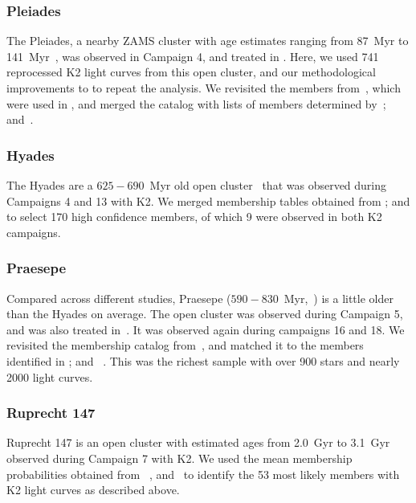 \documentclass{aa}
\begin{document}
\subsubsection{Pleiades}
The Pleiades, a nearby ZAMS cluster with age estimates ranging from 87~Myr to 141~Myr~\citep{bell_pre-main-sequence_2012, scholz2015, dahm_reexamining_2015, yen2018, gossage2018, bossini2019}, was observed in Campaign 4, and treated in . Here, we used 741 reprocessed K2 light curves from this open cluster, and our methodological improvements to  to repeat the analysis. We revisited the members from~\citet{rebull_pleiadesrot_2016}, which were used in , and merged the catalog with lists of members determined by~\citet{olivares_pleiades_2018, gaia_dr2_2018_hrd}; and~\citet{cantat_gaudin_2018}.
\subsubsection{Hyades}
The Hyades are a $625-690$~Myr old open cluster~\citep{perryman1998,salaris_age_2004, gossage2018, gaia_dr2_2018_hrd} that was observed during Campaigns 4 and 13 with K2.  We merged membership tables obtained from \citet{douglas_praesepe_hyades_2014, reino_hyades_2018}; and \citet{gaia_dr2_2018_hrd} to select 170 high confidence members, of which 9 were observed in both K2 campaigns. 
\subsubsection{Praesepe}
Compared across different studies, Praesepe ($590-830$~Myr,~\citealt{salaris_age_2004, boudreault_astrometric_2012, scholz2015, yen2018, gossage2018, bossini2019}) is a little older than the Hyades on average. The open cluster was observed during Campaign 5, and was also treated in~. It was observed again during campaigns 16 and 18. We revisited the membership catalog from~\citet{douglas_praesepe_hyades_2014}, and matched it to the members identified in \citet{douglas_poking_2017, rebull_praesepe_2017,cantat_gaudin_2018}; and ~\citet{gaia_dr2_2018_hrd}. This was the richest sample with over 900 stars and nearly 2000 light curves.
\subsubsection{Ruprecht 147}
Ruprecht 147 is an open cluster with estimated ages from 2.0~Gyr to 3.1~Gyr~\citep{curtis2013,scholz2015,gaia_dr2_2018_hrd,torres2018} observed during Campaign 7 with K2. We used the mean membership probabilities obtained from ~\citet{curtis2013, cantat_gaudin_2018, olivares_ngc6774_2019}, and~\citet{gaia_dr2_2018_hrd} to identify the 53 most likely members with K2 light curves as described above.
\end{document}
